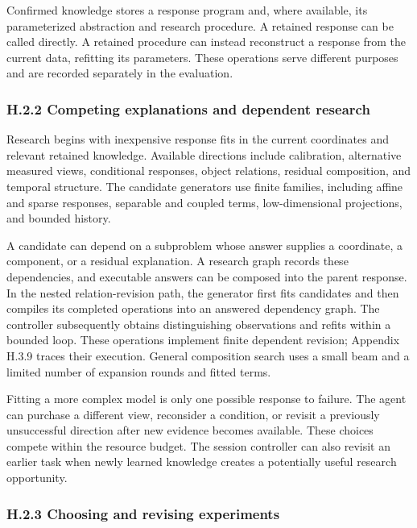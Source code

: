 \documentclass[twoside,11pt]{article}
\begin{document}
Confirmed knowledge stores a response program and, where available, its parameterized abstraction and research procedure. A retained response can be called directly. A retained procedure can instead reconstruct a response from the current data, refitting its parameters. These operations serve different purposes and are recorded separately in the evaluation.


\subsubsection*{H.2.2 Competing explanations and dependent research}

Research begins with inexpensive response fits in the current coordinates and relevant retained knowledge. Available directions include calibration, alternative measured views, conditional responses, object relations, residual composition, and temporal structure. The candidate generators use finite families, including affine and sparse responses, separable and coupled terms, low-dimensional projections, and bounded history.


A candidate can depend on a subproblem whose answer supplies a coordinate, a component, or a residual explanation. A research graph records these dependencies, and executable answers can be composed into the parent response. In the nested relation-revision path, the generator first fits candidates and then compiles its completed operations into an answered dependency graph. The controller subsequently obtains distinguishing observations and refits within a bounded loop. These operations implement finite dependent revision; Appendix H.3.9 traces their execution. General composition search uses a small beam and a limited number of expansion rounds and fitted terms.


Fitting a more complex model is only one possible response to failure. The agent can purchase a different view, reconsider a condition, or revisit a previously unsuccessful direction after new evidence becomes available. These choices compete within the resource budget. The session controller can also revisit an earlier task when newly learned knowledge creates a potentially useful research opportunity.


\subsubsection*{H.2.3 Choosing and revising experiments}
\end{document}

